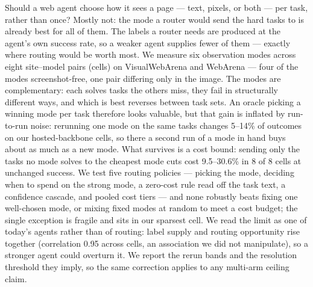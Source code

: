 Should a web agent choose how it sees a page --- text, pixels, or both --- per task, rather than once? Mostly not: the mode a router would send the hard tasks to is already best for all of them. The labels a router needs are produced at the agent's own success rate, so a weaker agent supplies fewer of them --- exactly where routing would be worth most. We measure six observation modes across eight site--model pairs (cells) on VisualWebArena and WebArena --- four of the modes screenshot-free, one pair differing only in the image. The modes are complementary: each solves tasks the others miss, they fail in structurally different ways, and which is best reverses between task sets. An oracle picking a winning mode per task therefore looks valuable, but that gain is inflated by run-to-run noise: rerunning one mode on the same tasks changes 5--14\% of outcomes on our hosted-backbone cells, so there a second run of a mode in hand buys about as much as a new mode. What survives is a cost bound: sending only the tasks no mode solves to the cheapest mode cuts cost 9.5--30.6\% in 8 of 8 cells at unchanged success. We test five routing policies --- picking the mode, deciding when to spend on the strong mode, a zero-cost rule read off the task text, a confidence cascade, and pooled cost tiers --- and none robustly beats fixing one well-chosen mode, or mixing fixed modes at random to meet a cost budget; the single exception is fragile and sits in our sparsest cell. We read the limit as one of today's agents rather than of routing: label supply and routing opportunity rise together (correlation 0.95 across cells, an association we did not manipulate), so a stronger agent could overturn it. We report the rerun bands and the resolution threshold they imply, so the same correction applies to any multi-arm ceiling claim.

